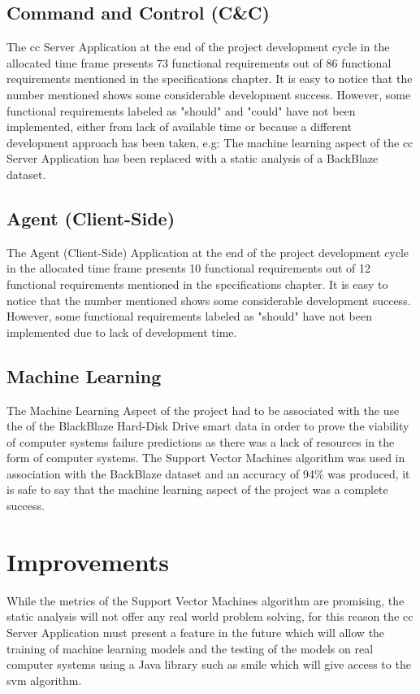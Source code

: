\subsection{Command and Control (C\&C)}

The \acrfull{cc} Server Application at the end of the project development cycle in the allocated time frame presents
73 functional requirements out of 86 functional requirements mentioned in the specifications chapter. It is easy to
notice that the number mentioned shows some considerable development success. However, some functional requirements
labeled as "should" and "could" have not been implemented, either from lack of available time or because a different
development approach has been taken, e.g: The machine learning aspect of the \acrfull{cc} Server Application has been
replaced with a static analysis of a BackBlaze dataset.

\subsection{Agent (Client-Side)}

The Agent (Client-Side) Application at the end of the project development cycle in the allocated time frame presents
10 functional requirements out of 12 functional requirements mentioned in the specifications chapter. It is easy to
notice that the number mentioned shows some considerable development success. However, some functional requirements
labeled as "should" have not been implemented due to lack of development time.

\subsection{Machine Learning}

The Machine Learning Aspect of the project had to be associated with the use the of the BlackBlaze Hard-Disk Drive
\acrfull{smart} data in order to prove the viability of computer systems failure predictions as there was a lack of
resources in the form of computer systems. The Support Vector Machines algorithm was used in association with the
BackBlaze dataset and an accuracy of 94\% was produced, it is safe to say that the machine learning aspect of the
project was a complete success.

\section{Improvements}

While the metrics of the Support Vector Machines algorithm are promising, the static analysis will not offer any real
world problem solving, for this reason the \acrfull{cc} Server Application must present a feature in the future which
will allow the training of machine learning models and the testing of the models on real computer systems using a Java
library such as \acrfull{smile} which will give access to the \acrfull{svm} algorithm.